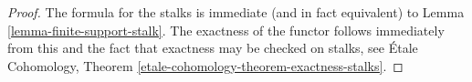 \documentclass{stacks-project}
\theoremstyle{plain}
\theoremstyle{definition}
\theoremstyle{remark}
\numberwithin{equation}{subsection}
\begin{document}
\begin{proof}
The formula for the stalks is immediate (and in fact equivalent) to
Lemma \ref{lemma-finite-support-stalk}.
The exactness of the functor follows immediately from this
and the fact that exactness may be checked on stalks, see
\'Etale Cohomology, Theorem \ref{etale-cohomology-theorem-exactness-stalks}.
\end{proof}
\end{document}
